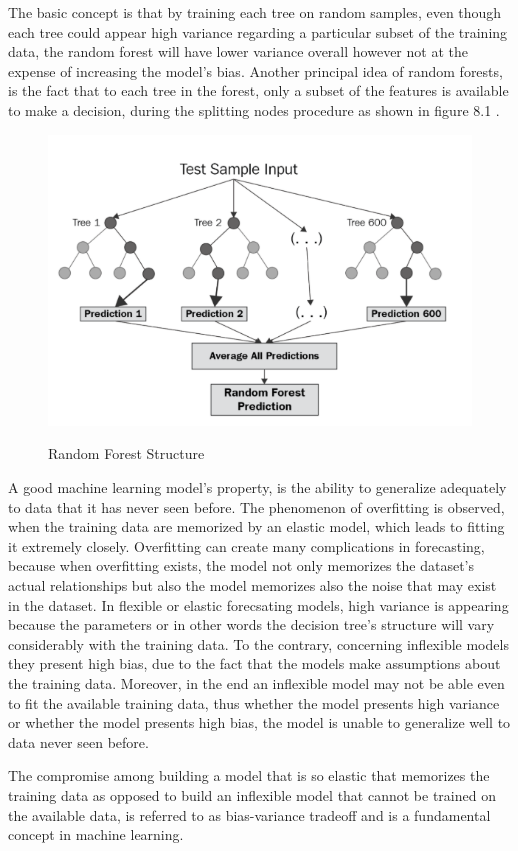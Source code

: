 The basic concept is that by training each tree on random samples, even though each tree could appear high variance regarding a particular subset of the training data, the random forest will have lower variance overall however not at the expense of increasing the model's bias. Another principal idea of random forests, is the fact that to each tree in the forest, only a subset of the features is available to make a decision, during the splitting nodes procedure as shown in figure 8.1 \cite{rfr}.
\begin{figure}[htbp]
\centering
\includegraphics[width=0.7\linewidth]{project/rf.png}
\label{fig:felix}
\caption{Random Forest Structure}
\end{figure}
\par A good machine learning model's property, is the ability to generalize adequately to data that it has never seen before.
The phenomenon of overfitting is observed, when the training data are memorized by an elastic model, which leads to fitting it extremely closely.  Overfitting can create many complications in forecasting, because when overfitting exists, the model not only memorizes the dataset's actual relationships but also the model memorizes also the noise that may exist in the dataset. In flexible or elastic forecsating models, high variance is appearing because the parameters or in other words the decision tree's structure  will vary considerably with the training data. To the contrary, concerning inflexible models they present high bias, due to the fact that the models make assumptions about the training data. Moreover, in the end an inflexible model may not be able even to fit the available training data, thus whether the model presents high variance or whether the model presents high bias, the model is unable to generalize well to data never seen before.
\par 
The compromise among building a model that is so elastic that memorizes the training data as opposed to build an inflexible model that cannot be trained on the available data, is referred to as bias-variance tradeoff and is a fundamental concept in machine learning.

